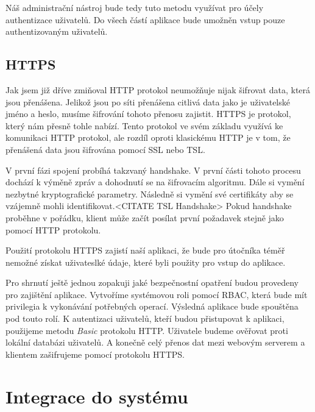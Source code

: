     Náš administrační nástroj bude tedy tuto metodu využívat pro účely authentizace uživatelů. Do všech částí aplikace bude umožněn vstup pouze authentizovaným uživatelů.
    
    \subsection{HTTPS}
    \label{https}
    Jak jsem již dříve zmiňoval HTTP protokol neumožňuje nijak šifrovat data, která jsou přenášena. Jelikož jsou po síti přenášena citlivá data jako je uživatelské jméno a heslo, musíme šifrování tohoto přenosu zajistit. HTTPS je protokol, který nám přesně tohle nabízí. Tento protokol ve svém základu využívá ke komunikaci HTTP protokol, ale rozdíl oproti klasickému HTTP je v tom, že přenášená data jsou šifrována pomocí SSL nebo TSL.
     
    V první fázi spojení probíhá takzvaný handshake. V první části tohoto procesu dochází k výměně zpráv a dohodnutí se na šifrovacím algoritmu. Dále si vymění nezbytné kryptografické parametry. Následně si vymění své certifikáty aby se vzájemně mohli identifikovat.<CITATE TSL Handshake> Pokud handshake proběhne v pořádku, klient může začít posílat první požadavek stejně jako pomocí HTTP protokolu.
    
    Použití protokolu HTTPS zajistí naší aplikaci, že bude pro útočníka téměř nemožné získat uživateslké údaje, které byli použity pro vstup do aplikace.
    
    
    Pro shrnutí ještě jednou zopakuji jaké bezpečnostní opatření budou provedeny pro zajištění aplikace. Vytvoříme systémovou roli pomocí RBAC, která bude mít privilegia k vykonávání potřebných operací. Výsledná aplikace bude spouštěna pod touto rolí. K autentizaci uživatelů, kteří budou přistupovat k aplikaci, použijeme metodu \emph{Basic} protokolu HTTP. Uživatele budeme ověřovat proti lokální databázi uživatelů. A konečně celý přenos dat mezi webovým serverem a klientem zašifrujeme pomocí protokolu HTTPS.

\section{Integrace do systému} 